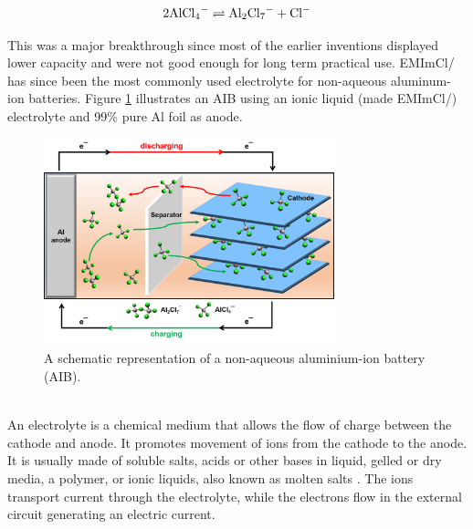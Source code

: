 \begin{align}\label{eq4}
   2\ce{AlCl4^{-}} \rightleftharpoons \ce{Al2Cl7-}+\ce{Cl-} 
\end{align}

This was a major breakthrough since most of the earlier inventions displayed lower capacity and were not good enough for long term practical use. EMImCl/  has since been the most commonly used electrolyte for non-aqueous aluminum-ion batteries.
Figure \ref{Figures/chap1fig:AIBmech} illustrates an AIB using an ionic liquid  (made EMImCl/) electrolyte and 99\% pure Al foil as anode.

\begin{figure}[tbh!]
\centering
\includegraphics[width=0.75\textwidth]{Figures/chap1fig/AIBmech}
\caption{A schematic representation of a non-aqueous aluminium-ion battery (AIB).}
\label{Figures/chap1fig:AIBmech}
\end{figure}\\

An electrolyte is a chemical medium that allows the flow of charge between the cathode and anode. It promotes movement of ions from the cathode to the anode. It is usually made of soluble salts, acids or other bases in liquid, gelled or dry media, a polymer, or ionic liquids, also known as molten salts \cite{xu_nonaqueous_2004,armand_ionic-liquid_2009,croce_nanocomposite_1998}. The ions transport current through the electrolyte, while the electrons flow in the external circuit generating an electric current.

